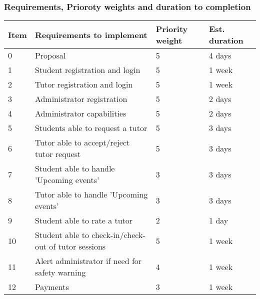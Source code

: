 \documentclass[12pt]{article}
\begin{document}
{\subsubsection{Requirements, Prioroty weights and duration to completion}
{
\centering
\begin{longtable}{| p{1.5cm} | p{8cm}| p{2cm}| p{3cm} |}
\hline			
			\textbf{Item} & \textbf{Requirements to implement} & \textbf{Priority weight}	& \textbf{Est. duration}	
			
	\\ \hline 0 & Proposal & 5 & 4 days
		\\ \hline 1 & Student registration and login & 5 & 1 week\\ \hline 
			
			2 & Tutor registration and login & 5 & 1 week\\ \hline	
 
			3 & Administrator registration & 5 & 2 days \\ \hline  

			
			4 & Administrator capabilities & 5 & 2 days\\ \hline 
			
			5 & Students able to request a tutor & 5 & 3 days\\ \hline

				6 & Tutor able to accept/reject tutor request & 5 & 3 days\\ \hline

				7 & Student able to handle 'Upcoming events'  & 3 & 3 days \\ \hline	
				
				8 & Tutor able to handle 'Upcoming events'  & 3 & 3 days\\ \hline	
							
				9 & Student able to rate a tutor & 2 & 1 day\\ \hline

				10 & Student able to check-in/check-out of tutor sessions  & 5 & 1 week\\ \hline	

				11 & Alert administrator if need for safety warning  & 4 & 1 week \\ \hline	

				12 & Payments  & 3 & 1 week \\ \hline	


\end{longtable}}}
\end{document}
